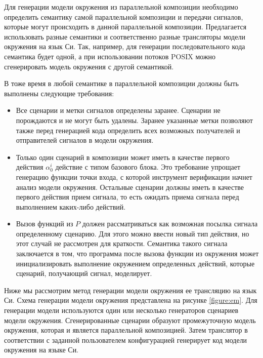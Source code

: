 \documentclass[%
candidate,     %
href,        %
colorlinks,  %
]{disser}
\begin{document}
Для генерации модели окружения из параллельной композиции необходимо определить семантику самой параллельной композиции и передачи сигналов, которые могут происходить в данной параллельной композиции.
Предлагается использовать разные семантики и соответственно разные трансляторы модели окружения на язык Си.
Так, например, для генерации последовательного кода семантика будет одной, а при использовании потоков POSIX можно сгенерировать модель окружения с другой семантикой.

В тоже время в любой семантике в параллельной композиции должны быть выполнены следующие требования:
\begin{itemize}
    \item Все сценарии и метки сигналов определены заранее. Сценарии не порождаются и не могут быть удалены. Заранее указанные метки позволяют также перед генерацией кода определить всех возможных получателей и отправителей сигналов в модели окружения.
    \item Только один сценарий в композиции может иметь в качестве первого действия $\alpha^i_0$ действие с типом базового блока. 
    Это требование упрощает генерацию функции точки входа, с которой инструмент верификации начнет анализ модели окружения.
    Остальные сценарии должны иметь в качестве первого действия прием сигнала, то есть ожидать приема сигнала перед выполнением каких-либо действий.
    \item Вызов функций из $P$ должен рассматриваться как возможная посылка сигнала определенному сценарию. 
    Для этого можно ввести новый тип действия, но этот случай не рассмотрен для краткости.
    Семантика такого сигнала заключается в том, что программа после вызова функции из окружения может инициализировать выполнение окружением определенных действий, которые сценарий, получающий сигнал, моделирует.
\end{itemize}

Ниже мы рассмотрим метод генерации модели окружения ее трансляцию на язык Си. 
Схема генерации модели окружения представлена на рисунке \ref{figure:em}.
Для генерации модели используются один или несколько генераторов сценариев модели окружения.
Сгенерированные сценарии образуют промежуточную модель окружения, которая и является параллельной композицией.
Затем транслятор в соответствии с заданной пользователем конфигурацией генерирует код модели окружения на языке Си.
\end{document}
